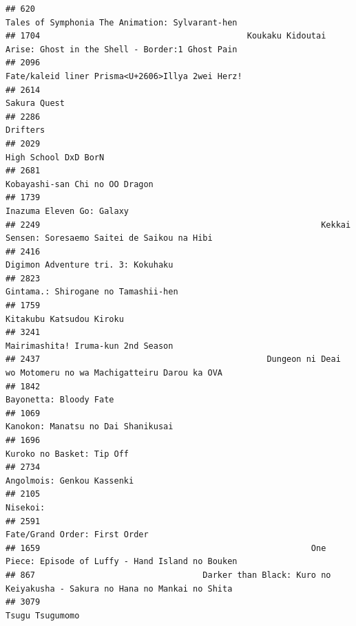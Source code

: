 \documentclass[
]{article}
\begin{document}
\begin{verbatim}
## 620                                                            Tales of Symphonia The Animation: Sylvarant-hen
## 1704                                          Koukaku Kidoutai Arise: Ghost in the Shell - Border:1 Ghost Pain
## 2096                                                          Fate/kaleid liner Prisma<U+2606>Illya 2wei Herz!
## 2614                                                                                              Sakura Quest
## 2286                                                                                                  Drifters
## 2029                                                                                      High School DxD BorN
## 2681                                                                            Kobayashi-san Chi no OO Dragon
## 1739                                                                                 Inazuma Eleven Go: Galaxy
## 2249                                                         Kekkai Sensen: Soresaemo Saitei de Saikou na Hibi
## 2416                                                                        Digimon Adventure tri. 3: Kokuhaku
## 2823                                                                       Gintama.: Shirogane no Tamashii-hen
## 1759                                                                                  Kitakubu Katsudou Kiroku
## 3241                                                                        Mairimashita! Iruma-kun 2nd Season
## 2437                                              Dungeon ni Deai wo Motomeru no wa Machigatteiru Darou ka OVA
## 1842                                                                                    Bayonetta: Bloody Fate
## 1069                                                                        Kanokon: Manatsu no Dai Shanikusai
## 1696                                                                                 Kuroko no Basket: Tip Off
## 2734                                                                                Angolmois: Genkou Kassenki
## 2105                                                                                                  Nisekoi:
## 2591                                                                             Fate/Grand Order: First Order
## 1659                                                       One Piece: Episode of Luffy - Hand Island no Bouken
## 867                                  Darker than Black: Kuro no Keiyakusha - Sakura no Hana no Mankai no Shita
## 3079                                                                                           Tsugu Tsugumomo

\end{verbatim}
\end{document}
